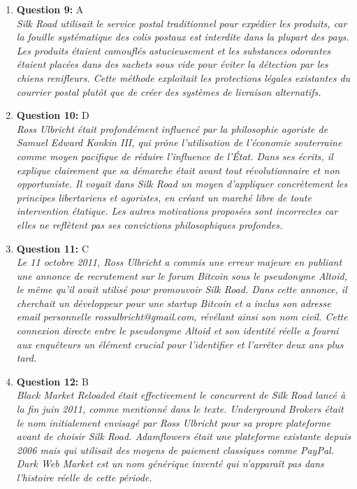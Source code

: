 \documentclass[12pt,a4paper]{article}
\begin{document}
\begin{enumerate}
\item \textbf{Question 9:} A
\\ \textit{Silk Road utilisait le service postal traditionnel pour expédier les produits, car la fouille systématique des colis postaux est interdite dans la plupart des pays. Les produits étaient camouflés astucieusement et les substances odorantes étaient placées dans des sachets sous vide pour éviter la détection par les chiens renifleurs. Cette méthode exploitait les protections légales existantes du courrier postal plutôt que de créer des systèmes de livraison alternatifs.}

\item \textbf{Question 10:} D
\\ \textit{Ross Ulbricht était profondément influencé par la philosophie agoriste de Samuel Edward Konkin III, qui prône l'utilisation de l'économie souterraine comme moyen pacifique de réduire l'influence de l'État. Dans ses écrits, il explique clairement que sa démarche était avant tout révolutionnaire et non opportuniste. Il voyait dans Silk Road un moyen d'appliquer concrètement les principes libertariens et agoristes, en créant un marché libre de toute intervention étatique. Les autres motivations proposées sont incorrectes car elles ne reflètent pas ses convictions philosophiques profondes.}

\item \textbf{Question 11:} C
\\ \textit{Le 11 octobre 2011, Ross Ulbricht a commis une erreur majeure en publiant une annonce de recrutement sur le forum Bitcoin sous le pseudonyme Altoid, le même qu'il avait utilisé pour promouvoir Silk Road. Dans cette annonce, il cherchait un développeur pour une startup Bitcoin et a inclus son adresse email personnelle rossulbricht@gmail.com, révélant ainsi son nom civil. Cette connexion directe entre le pseudonyme Altoid et son identité réelle a fourni aux enquêteurs un élément crucial pour l'identifier et l'arrêter deux ans plus tard.}

\item \textbf{Question 12:} B
\\ \textit{Black Market Reloaded était effectivement le concurrent de Silk Road lancé à la fin juin 2011, comme mentionné dans le texte. Underground Brokers était le nom initialement envisagé par Ross Ulbricht pour sa propre plateforme avant de choisir Silk Road. Adamflowers était une plateforme existante depuis 2006 mais qui utilisait des moyens de paiement classiques comme PayPal. Dark Web Market est un nom générique inventé qui n'apparaît pas dans l'histoire réelle de cette période.}


\end{enumerate}
\end{document}
